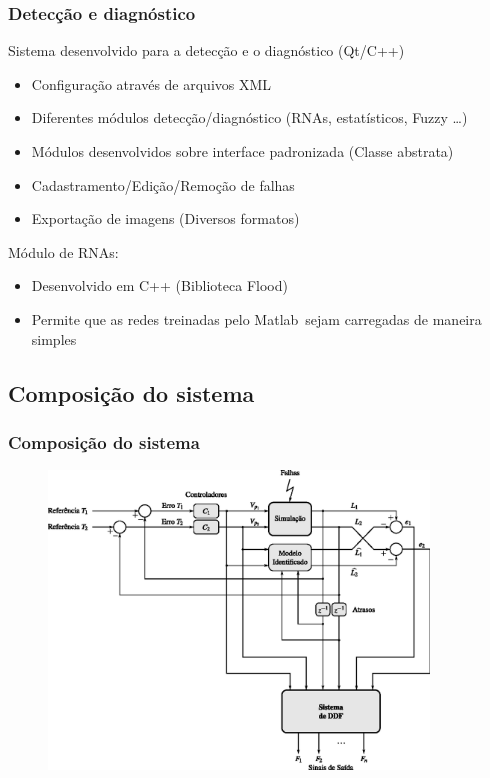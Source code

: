 \documentclass{beamer}
\begin{document}
\begin{frame}
    \frametitle{Detecção e diagnóstico}

    Sistema desenvolvido para a detecção e o diagnóstico (Qt/C++)

\begin{itemize}
    \item Configuração através de arquivos XML
    \item Diferentes módulos detecção/diagnóstico (RNAs, estatísticos, Fuzzy
          \ldots)
    \item Módulos desenvolvidos sobre interface padronizada (Classe abstrata)
    \item Cadastramento/Edição/Remoção de falhas
    \item Exportação de imagens (Diversos formatos)
\end{itemize}

    Módulo de RNAs:

\begin{itemize}
    \item Desenvolvido em C++ (Biblioteca Flood)
    \item Permite que as redes treinadas pelo Matlab\reg\ sejam carregadas de
          maneira simples
\end{itemize}

\end{frame}

\subsection{Composição do sistema}
\begin{frame}
    \frametitle{Composição do sistema}

\begin{figure}[htb]
\centering
    \includegraphics[width=0.9\textwidth]{imgs/sistema/eps/composicao_mod_0}
\end{figure}
\end{frame}
\end{document}
